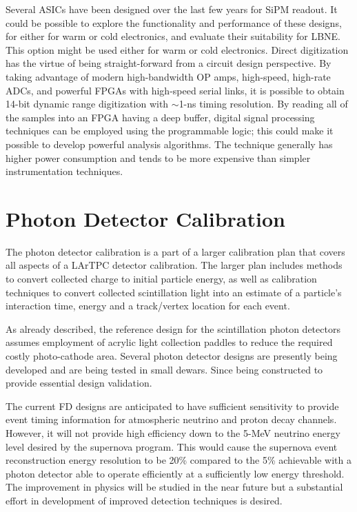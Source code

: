 Several ASICs have been designed over the last few years for SiPM
readout.  It could be possible to explore the functionality and
performance of these designs, for either for warm or cold electronics,
and evaluate their suitability for LBNE. This option might be used
either for warm or cold electronics.  Direct digitization has the
virtue of being straight-forward from a circuit design perspective. By
taking advantage of modern high-bandwidth OP amps, high-speed,
high-rate ADCs, and powerful FPGAs with high-speed serial links, it is
possible to obtain 14-bit dynamic range digitization with $\sim$1-ns
timing resolution.  By reading all of the samples into an FPGA having
a deep buffer, digital signal processing techniques can be employed
using the programmable logic; this could make it possible to develop
powerful analysis algorithms. The technique generally has higher power
consumption and tends to be more expensive than simpler
instrumentation techniques.

\section{Photon Detector Calibration}
\label{sec_pd_calib}

The photon detector calibration is a part of a larger calibration plan
that covers all aspects of a LArTPC detector calibration. The larger
plan includes methods to convert collected charge to initial particle
energy, as well as calibration techniques to convert collected
scintillation light into an estimate of a particle's interaction time,
energy and a track/vertex location for each event.

As already described, the reference design for the scintillation
photon detectors assumes employment of acrylic light collection
paddles to reduce the required costly photo-cathode area. Several
photon detector designs are presently being developed and are being
tested in small dewars. Since %
being constructed to provide essential design validation.

The current FD designs are anticipated to have
sufficient sensitivity to provide event timing information for
atmospheric neutrino and proton decay channels. However, it will not
provide high efficiency down to the 5-MeV neutrino energy level
desired by the supernova program. %
This would cause the supernova event reconstruction energy resolution to be 20\% compared to the 5\%
achievable with %
a photon detector
able to operate efficiently at a sufficiently low energy
threshold. The improvement in physics will be studied in the near
future but a substantial effort in development of improved detection
techniques is desired. 

